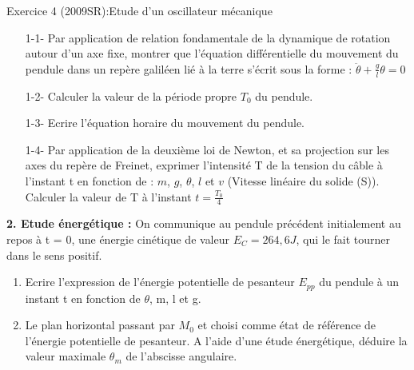 \documentclass[12pt, french]{article}
\begin{document}
\begin{Box2}{Exercice 4 (2009SR):Etude d’un oscillateur mécanique}
\begin{enumerate}
  \item[1-1-] Par application de relation fondamentale de la
dynamique de rotation autour d’un axe fixe, montrer
que l’équation différentielle du mouvement du
pendule dans un repère galiléen lié à la terre s’écrit
    sous la forme : $\ddot{\theta} + \frac{g}{l}\theta = 0$
  \item[1-2-] Calculer la valeur de la période propre $T_0$ du pendule.
  \item[1-3-] Ecrire l’équation horaire du mouvement du pendule.
  \item[1-4-] Par application de la deuxième loi de Newton, et sa projection sur les axes
du repère de Freinet, exprimer l’intensité T de la tension du câble à
l’instant t en fonction de : $m$, $g$, $\theta$, $l$ et $v$ (Vitesse linéaire du solide (S)).
    Calculer la valeur de T à l’instant $t = \frac{T_0}{4}$
\end{enumerate}
  \textbf{2. Etude énergétique :}
  On communique au pendule précédent initialement au repos à t = 0, une énergie
cinétique de valeur $E_C = 264,6 J$, qui le fait tourner dans le sens positif.
\begin{enumerate}
  \item Ecrire l’expression de l’énergie potentielle de pesanteur $E_{pp}$ du pendule à un
instant t en fonction de $\theta$, m, l et g.
\item Le plan horizontal passant par $M_0$ et choisi comme état de référence de l’énergie
potentielle de pesanteur.
A l’aide d’une étude énergétique, déduire la valeur maximale $\theta_m$ de
l’abscisse angulaire.

\end{enumerate}
\end{Box2}
\end{document}
